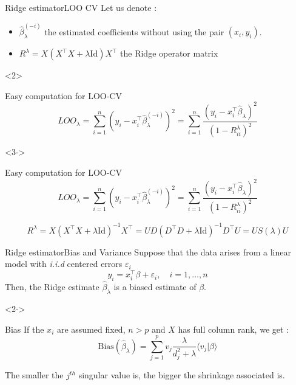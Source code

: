 \documentclass[10pt,aspectratio=43]{beamer}
\begin{document}
\begin{frame}{Ridge estimator}{LOO CV}
    Let us denote :
    \begin{itemize}
        \item $\hat \beta_\lambda^{(-i)}$ the estimated coefficients without using the pair $(x_i, y_i)$.
        \item $R^\lambda =  X(X^\top X + \lambda \mathrm{Id})X^\top$ the Ridge operator matrix
    \end{itemize}
    \begin{onlyenv}<2>
        \begin{block}{Easy computation for LOO-CV}
        $$ LOO_\lambda
        = \sum_{i=1}^n (y_i - x_i^\top \hat \beta_\lambda^{(-i)} )^2
        = \sum_{i=1}^n \frac{(y_i - x_i^\top \hat \beta_\lambda)^2}{(1 - R^\lambda_{ii})^2} $$
        \end{block}
    \end{onlyenv}
    \begin{onlyenv}<3->
        \begin{block}{Easy computation for LOO-CV}
        $$ LOO_\lambda
            = \sum_{i=1}^n (y_i - x_i^\top \hat \beta_\lambda^{(-i)} )^2
            = \sum_{i=1}^n \frac{(y_i - x_i^\top \hat \beta_\lambda)^2}{(1 - R^\lambda_{ii})^2} $$

        $$ R^\lambda
        =  X(X^\top X + \lambda \mathrm{Id})^{-1}X^\top
        = UD(D^\top D + \lambda \mathrm{Id})^{-1} D^\top U
        = U S(\lambda) U$$
        \end{block}
    \end{onlyenv}
\end{frame}

\begin{frame}{Ridge estimator}{Bias and Variance}
    Suppose that the data arises from a linear model with \emph{i.i.d} centered errors $\varepsilon_i$
    $$ y_i = x_i^\top \beta + \varepsilon_i, \quad i=1, \dots, n$$
    Then, the Ridge estimate $\hat \beta_{\lambda}$ is a biased estimate of $\beta$.
    \begin{onlyenv}<2->
        \begin{block}{Bias}
            If the $x_i$ are assumed fixed, $n > p$ and $X$ has full column rank, we get :
            $$ \mathrm{Bias}(\hat \beta_\lambda) = \sum_{j=1}^p v_j \frac{\lambda}{d_j^2 + \lambda} \langle v_j \vert \beta \rangle $$
        \end{block}
        The smaller the $j^{th}$ singular value is, the bigger the shrinkage associated is.
    \end{onlyenv}
\end{frame}
\end{document}
